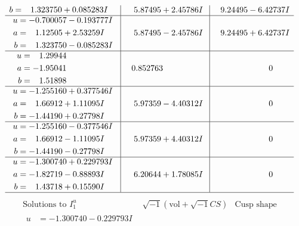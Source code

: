 \documentclass[1p]{elsarticle_modified}
\theoremstyle{definition}
\newcommand{\I}{\sqrt{-1}}
\begin{document}
$$\begin{array}{c|c|c}
\begin{aligned}
b &= \phantom{-}1.323750 + 0.085283 I\end{aligned}
 & \phantom{-}5.87495 + 2.45786 I & \phantom{-}9.24495 - 6.42737 I \\ \hline\begin{aligned}
u &= -0.700057 - 0.193777 I \\
a &= \phantom{-}1.12505 + 2.53259 I \\
b &= \phantom{-}1.323750 - 0.085283 I\end{aligned}
 & \phantom{-}5.87495 - 2.45786 I & \phantom{-}9.24495 + 6.42737 I \\ \hline\begin{aligned}
u &= \phantom{-}1.29944\phantom{ +0.000000I} \\
a &= -1.95041\phantom{ +0.000000I} \\
b &= \phantom{-}1.51898\phantom{ +0.000000I}\end{aligned}
 & \phantom{-}0.852763\phantom{ +0.000000I} & \phantom{-0.000000 } 0 \\ \hline\begin{aligned}
u &= -1.255160 + 0.377546 I \\
a &= \phantom{-}1.66912 + 1.11095 I \\
b &= -1.44190 + 0.27798 I\end{aligned}
 & \phantom{-}5.97359 - 4.40312 I & \phantom{-0.000000 } 0 \\ \hline\begin{aligned}
u &= -1.255160 - 0.377546 I \\
a &= \phantom{-}1.66912 - 1.11095 I \\
b &= -1.44190 - 0.27798 I\end{aligned}
 & \phantom{-}5.97359 + 4.40312 I & \phantom{-0.000000 } 0 \\ \hline\begin{aligned}
u &= -1.300740 + 0.229793 I \\
a &= -1.82719 - 0.88893 I \\
b &= \phantom{-}1.43718 + 0.15590 I\end{aligned}
 & \phantom{-}6.20644 + 1.78085 I & \phantom{-0.000000 } 0\\
 \hline 
 \end{array}$$\newpage$$\begin{array}{c|c|c}  
\text{Solutions to }I^u_{1}& \I (\text{vol} + \sqrt{-1}CS) & \text{Cusp shape}\\
 \hline 
\begin{aligned}
u &= -1.300740 - 0.229793 I \\

\end{aligned}
\end{array}$$
\end{document}
